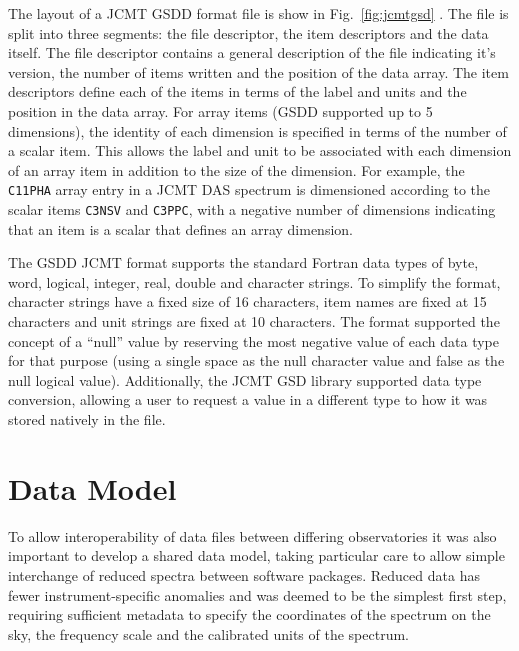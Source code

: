 \documentclass[final,authoryear,5p,times,twocolumn]{elsarticle}
\begin{document}
The layout of a JCMT GSDD format file is show in
Fig.~\ref{fig:jcmtgsd} \citep[see also][]{mtdn84}. The file is split
into three segments: the file descriptor, the item descriptors and the
data itself. The file descriptor contains a general description of the
file indicating it's version, the number of items written and the
position of the data array. The item descriptors define each of the
items in terms of the label and units and the position in the data
array. For array items (GSDD supported up to 5 dimensions), the
identity of each dimension is specified in terms of the number of a
scalar item. This allows the label and unit to be associated with each
dimension of an array item in addition to the size of the
dimension. For example, the \texttt{C11PHA} array entry in a JCMT DAS
spectrum \citep{1986SPIE..598..134B} is dimensioned according to the
scalar items \texttt{C3NSV} and \texttt{C3PPC}, with a negative number
of dimensions indicating that an item is a scalar that defines an
array dimension.

The GSDD JCMT format supports the standard Fortran data
types of byte, word, logical, integer, real, double and character
strings. To simplify the format, character strings have a fixed size
of 16 characters, item names are fixed at 15 characters and unit
strings are fixed at 10 characters. The format supported the concept
of a ``null'' value by reserving the most negative value of each data
type for that purpose (using a single space as the null character value
and false as the null logical value). Additionally, the JCMT GSD
library supported data type conversion, allowing a user to request a
value in a different type to how it was stored natively in the file.

\section{Data Model}

To allow interoperability of data files between differing
observatories it was also important to develop a shared data model,
taking particular care to allow simple interchange of reduced spectra
between software packages. Reduced data has fewer instrument-specific
anomalies and was deemed to be the simplest first step, requiring
sufficient metadata to specify the coordinates of the spectrum on the
sky, the frequency scale and the calibrated
units of the spectrum.
\end{document}
